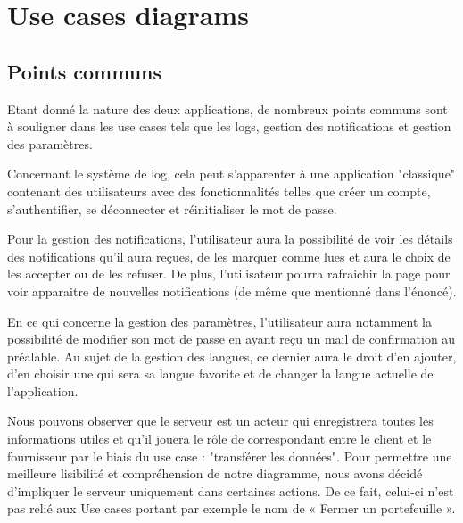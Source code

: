 \section{Use cases diagrams}
\subsection{Points communs}
\begin{flushleft}
Etant donné la nature des deux applications, de nombreux points communs sont à souligner dans les use cases tels que les logs, gestion des notifications et gestion des paramètres.
\end{flushleft}

\begin{flushleft}
Concernant le système de log, cela peut s'apparenter à une application "classique" contenant des utilisateurs avec des fonctionnalités telles que créer un compte, s’authentifier, se déconnecter et réinitialiser le mot de passe.
\end{flushleft}

\begin{flushleft}
Pour la gestion des notifications, l'utilisateur aura la possibilité de voir les détails des notifications qu'il aura reçues, de les marquer comme lues et aura le choix de les accepter ou de les refuser. De plus, l'utilisateur pourra rafraichir la page pour voir apparaitre de nouvelles notifications (de même que mentionné dans l'énoncé).
\end{flushleft}

\begin{flushleft}
En ce qui concerne la gestion des paramètres, l’utilisateur aura notamment la possibilité de modifier son mot de passe en ayant reçu un mail de confirmation au préalable.  Au sujet de la gestion des langues, ce dernier aura le droit d'en ajouter, d'en choisir une qui sera sa langue favorite et de changer la langue actuelle de l'application.
\end{flushleft}

\begin{flushleft}
Nous pouvons observer que le serveur est un acteur qui enregistrera toutes les informations utiles et qu’il jouera le rôle de correspondant entre le client et le fournisseur par le biais du use case : "transférer les données".
Pour permettre une meilleure lisibilité et compréhension de notre diagramme, nous avons décidé d’impliquer le serveur uniquement dans certaines actions. De ce fait, celui-ci n’est pas relié aux Use cases portant par exemple le nom de « Fermer un portefeuille ».
\end{flushleft}

